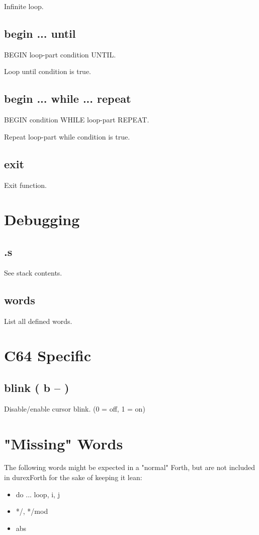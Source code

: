 Infinite loop.

\subsection{begin ... until}

BEGIN loop-part condition UNTIL.

Loop until condition is true.

\subsection{begin ... while ... repeat}

BEGIN condition WHILE loop-part REPEAT.

Repeat loop-part while condition is true.

\subsection{exit}

Exit function.


\section{Debugging}

\subsection{.s}

See stack contents.

\subsection{words}

List all defined words.


\section{C64 Specific}

\subsection{blink ( b -- )}

Disable/enable cursor blink. (0 = off, 1 = on)


\section{"Missing" Words}

The following words might be expected in a "normal" Forth, but are not included in durexForth for the sake of keeping it lean:

\begin{itemize}
\item do ... loop, i, j
\item */, */mod
\item abs
\end{itemize}
